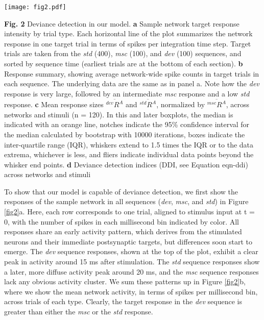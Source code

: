 \documentclass[pdflatex,referee,iicol,sn-basic]{sn-jnl}
\newcommand{\dev}{\textit{dev}}
\newcommand{\msc}{\textit{msc}}
\newcommand{\std}{\textit{std}}
\renewcommand{\R}[3][]{{}^{#1}_{}\!R^{#2}_{#3}}
\newcommand{\mean}[1]{\overline{#1}}
\theoremstyle{thmstyleone}%
\theoremstyle{thmstyletwo}%
\theoremstyle{thmstylethree}%
\begin{document}
\begin{figure*}%
    \centering
    \texttt{[image: fig2.pdf]}
    \caption{}
    \label{fig2}
\end{figure*}
\textbf{Fig. 2} Deviance detection in our model. \textbf{a} Sample network target response intensity by trial type. Each horizontal line of the plot summarizes the network response in one target trial in terms of spikes per integration time step. Target trials are taken from the \std{} (400), \msc{} (100), and \dev{} (100) sequences, and sorted by sequence time (earliest trials are at the bottom of each section). \textbf{b} Response summary, showing average network-wide spike counts in target trials in each sequence. The underlying data are the same as in panel a. Note how the \dev{} response is very large, followed by an intermediate \msc{} response and a low \std{} response.
\textbf{c} Mean response sizes $\mean{\R[dev]{A}{}}$ and $\mean{\R[std]{A}{}}$, normalized by $\mean{\R[msc]{A}{}}$, across networks and stimuli (n = 120). In this and later boxplots, the median is indicated with an orange line, notches indicate the 95\% confidence interval for the median calculated by bootstrap with 10000 iterations, boxes indicate the inter-quartile range (IQR), whiskers extend to 1.5 times the IQR or to the data extrema, whichever is less, and fliers indicate individual data points beyond the whisker end points.
\textbf{d} Deviance detection indices (DDI, see Equation {eqn-ddi}) across networks and stimuli

To show that our model is capable of deviance detection, we first show the responses of the sample network in all sequences (\dev{}, \msc{}, and \std{}) in Figure \ref{fig2}a. Here, each row corresponds to one trial, aligned to stimulus input at t = 0, with the number of spikes in each millisecond bin indicated by color. All responses share an early activity pattern, which derives from the stimulated neurons and their immediate postsynaptic targets, but differences soon start to emerge. The \dev{} sequence responses, shown at the top of the plot, exhibit a clear peak in activity around 15 ms after stimulation. The \std{} sequence responses show a later, more diffuse activity peak around 20 ms, and the \msc{} sequence responses lack any obvious activity cluster. We sum these patterns up in Figure \ref{fig2}b, where we show the mean network activity, in terms of spikes per millisecond bin, across trials of each type. Clearly, the target response in the \dev{} sequence is greater than either the \msc{} or the \std{} response.
\end{document}
